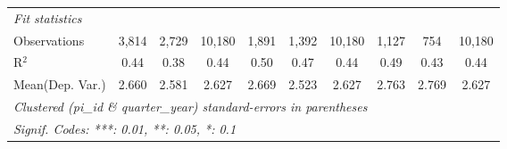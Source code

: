 \begin{tabular}{lccccccccc}
   \midrule
   \emph{Fit statistics}\\
   Observations                                                & 3,814         & 2,729         & 10,180        & 1,891          & 1,392         & 10,180        & 1,127   & 754       & 10,180\\  
   R$^2$                                                       & 0.44          & 0.38          & 0.44          & 0.50           & 0.47          & 0.44          & 0.49    & 0.43      & 0.44\\  
Mean(Dep. Var.) & 2.660 & 2.581 & 2.627 & 2.669 & 2.523 & 2.627 & 2.763 & 2.769 & 2.627 \\
   \midrule \midrule
   \multicolumn{10}{l}{\emph{Clustered (pi\_id \& quarter\_year) standard-errors in parentheses}}\\
   \multicolumn{10}{l}{\emph{Signif. Codes: ***: 0.01, **: 0.05, *: 0.1}}\\
\end{tabular}
\par\endgroup
